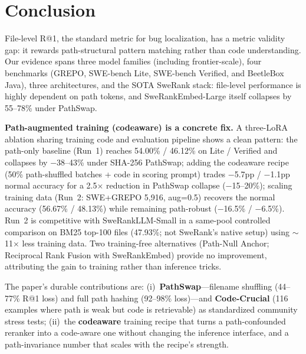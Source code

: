 \documentclass{article}
\begin{document}
\section{Conclusion}
\label{sec:conclusion}

File-level R@1, the standard metric for bug localization, has a metric validity gap: it rewards path-structural pattern matching rather than code understanding.
Our evidence spans three model families (including frontier-scale), four benchmarks (GREPO, SWE-bench Lite, SWE-bench Verified, and BeetleBox Java), three architectures, and the SOTA SweRank stack: file-level performance is highly dependent on path tokens, and SweRankEmbed-Large itself collapses by 55--78\% under PathSwap.

\textbf{Path-augmented training (codeaware) is a concrete fix.}
A three-LoRA ablation sharing training code and evaluation pipeline shows a clean pattern: the path-only baseline (Run~1) reaches 54.00\% / 46.12\% on Lite / Verified and collapses by $-$38--43\% under SHA-256 PathSwap; adding the codeaware recipe (50\% path-shuffled batches + code in scoring prompt) trades $-$5.7pp / $-$1.1pp normal accuracy for a 2.5$\times$ reduction in PathSwap collapse ($-$15--20\%); scaling training data (Run~2: SWE+GREPO 5{,}916, aug=0.5) recovers the normal accuracy (56.67\% / 48.13\%) while remaining path-robust ($-$16.5\% / $-$6.5\%). Run~2 is competitive with SweRankLLM-Small in a same-pool controlled comparison on BM25 top-100 files (47.93\%; not SweRank's native setup) using $\sim$11$\times$ less training data. Two training-free alternatives (Path-Null Anchor; Reciprocal Rank Fusion with SweRankEmbed) provide no improvement, attributing the gain to training rather than inference tricks.

The paper's durable contributions are: (i)~\textbf{PathSwap}---filename shuffling (44--77\% R@1 loss) and full path hashing (92--98\% loss)---and \textbf{Code-Crucial} (116 examples where path is weak but code is retrievable) as standardized community stress tests; (ii)~the \textbf{codeaware} training recipe that turns a path-confounded reranker into a code-aware one without changing the inference interface, and a path-invariance number that scales with the recipe's strength.






\end{document}
